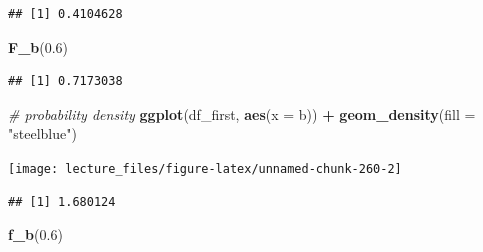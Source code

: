 \documentclass[]{book}
\newenvironment{Shaded}{\begin{snugshade}}{\end{snugshade}}
\newcommand{\KeywordTok}[1]{\textcolor[rgb]{0.13,0.29,0.53}{\textbf{#1}}}
\newcommand{\DataTypeTok}[1]{\textcolor[rgb]{0.13,0.29,0.53}{#1}}
\newcommand{\FloatTok}[1]{\textcolor[rgb]{0.00,0.00,0.81}{#1}}
\newcommand{\StringTok}[1]{\textcolor[rgb]{0.31,0.60,0.02}{#1}}
\newcommand{\CommentTok}[1]{\textcolor[rgb]{0.56,0.35,0.01}{\textit{#1}}}
\newcommand{\OperatorTok}[1]{\textcolor[rgb]{0.81,0.36,0.00}{\textbf{#1}}}
\newcommand{\NormalTok}[1]{#1}
\begin{document}
\begin{Shaded}
\end{Shaded}

\begin{verbatim}
## [1] 0.4104628
\end{verbatim}

\begin{Shaded}
\begin{Highlighting}[]
\KeywordTok{F_b}\NormalTok{(}\FloatTok{0.6}\NormalTok{)}
\end{Highlighting}
\end{Shaded}

\begin{verbatim}
## [1] 0.7173038
\end{verbatim}

\begin{Shaded}
\begin{Highlighting}[]
\CommentTok{# probability density}
\KeywordTok{ggplot}\NormalTok{(df_first, }\KeywordTok{aes}\NormalTok{(}\DataTypeTok{x =}\NormalTok{ b)) }\OperatorTok{+}\StringTok{ }\KeywordTok{geom_density}\NormalTok{(}\DataTypeTok{fill =} \StringTok{"steelblue"}\NormalTok{)}
\end{Highlighting}
\end{Shaded}

\begin{center}\texttt{[image: lecture\_files/figure-latex/unnamed-chunk-260-2]} \end{center}

\begin{Shaded}
\end{Shaded}

\begin{verbatim}
## [1] 1.680124
\end{verbatim}

\begin{Shaded}
\begin{Highlighting}[]
\KeywordTok{f_b}\NormalTok{(}\FloatTok{0.6}\NormalTok{)}
\end{Highlighting}
\end{Shaded}
\end{document}
